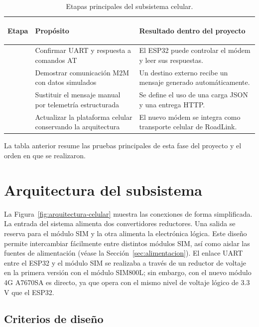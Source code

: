 \documentclass[11pt,letterpaper]{article}
\begin{document}
\begin{table}[H]
  \centering
  \caption{Etapas principales del subsistema celular.}
  \begin{tabularx}{\textwidth}{>{\bfseries\raggedright\arraybackslash}p{3.3cm} Y Y}
    \toprule
    Etapa & Propósito & Resultado dentro del proyecto \\
    \midrule
     & Confirmar UART y respuesta a comandos AT & El ESP32 puede controlar el módem y leer sus respuestas. \\
     & Demostrar comunicación M2M con datos simulados & Un destino externo recibe un mensaje generado automáticamente. \\
     & Sustituir el mensaje manual por telemetría estructurada & Se define el uso de una carga JSON y una entrega HTTP. \\
     & Actualizar la plataforma celular conservando la arquitectura & El nuevo módem se integra como transporte celular de RoadLink. \\
    \bottomrule
  \end{tabularx}
\end{table}

La tabla anterior resume las pruebas principales de esta fase del proyecto y el orden en que se realizaron.

\section{Arquitectura del subsistema}

La Figura~\ref{fig:arquitectura-celular} muestra las conexiones de forma simplificada. La
entrada del sistema alimenta dos convertidores reductores. Una salida se reserva
para el módulo SIM y la otra alimenta la electrónica lógica. Este diseño permite intercambiar fácilmente entre distintos módulos SIM, así como aislar las fuentes de alimentación (véase la Sección~\ref{sec:alimentacion}).
El enlace UART entre el ESP32 y el módulo SIM se realizaba a través de un reductor de voltaje en la primera versión con el módulo SIM800L; sin embargo, con el nuevo módulo 4G A7670SA es directo, ya que opera con el mismo nivel de voltaje lógico de 3.3 V que el ESP32.

\subsection{Criterios de diseño}
\end{document}
